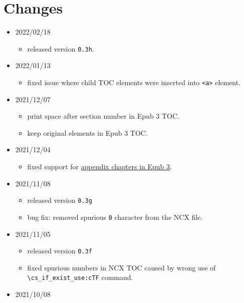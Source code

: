 \hypertarget{changes}{%
\section{Changes}\label{changes}}

\begin{itemize}
\item
  2022/02/18

  \begin{itemize}
  \tightlist
  \item
    released version \texttt{0.3h}.
  \end{itemize}
\item
  2022/01/13

  \begin{itemize}
  \tightlist
  \item
    fixed issue where child TOC elements were inserted into
    \texttt{\textless{}a\textgreater{}} element.
  \end{itemize}
\item
  2021/12/07

  \begin{itemize}
  \tightlist
  \item
    print space after section number in Epub 3 TOC.
  \item
    keep original elements in Epub 3 TOC.
  \end{itemize}
\item
  2021/12/04

  \begin{itemize}
  \tightlist
  \item
    fixed support for
    \href{https://github.com/michal-h21/tex4ebook/issues/85}{appendix
    chapters in Epub 3}.
  \end{itemize}
\item
  2021/11/08

  \begin{itemize}
  \tightlist
  \item
    released version \texttt{0.3g}
  \item
    bug fix: removed spurious \texttt{0} character from the NCX file.
  \end{itemize}
\item
  2021/11/05

  \begin{itemize}
  \tightlist
  \item
    released version \texttt{0.3f}
  \item
    fixed spurious numbers in NCX TOC caused by wrong use of
    \texttt{\textbackslash{}cs\_if\_exist\_use:cTF} command.
  \end{itemize}
\item
  2021/10/08


\end{itemize}
